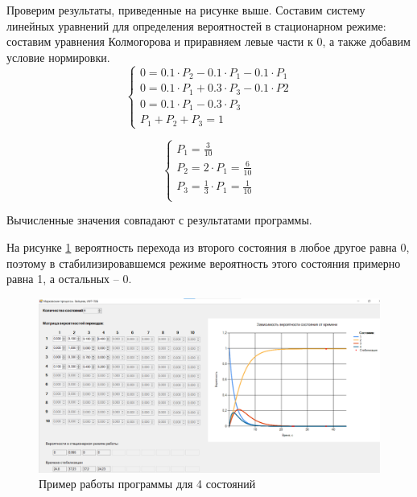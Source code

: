 \documentclass[14pt, a4paper]{extarticle}
\begin{document}
Проверим результаты, приведенные на рисунке выше. Составим систему линейных уравнений для определения вероятностей в стационарном режиме: составим уравнения Колмогорова и приравняем левые части к 0, а также добавим условие нормировки.
\begin{equation}
	\left\{\begin{array}{l}
		0 = 0.1 \cdot P_2 - 0.1 \cdot P_1 - 0.1 \cdot P_1 \\
		0 = 0.1 \cdot P_1 + 0.3 \cdot P_3 - 0.1 \cdot P2 \\
		0 = 0.1 \cdot P_1 - 0.3 \cdot P_3 \\
		P_1 + P_2 + P_3 = 1
	\end{array}\right.
\end{equation}

\begin{equation}
	\left\{\begin{array}{l}
		P_1 = \frac{3}{10} \\
		P_2 = 2 \cdot P_1 = \frac{6}{10} \\
		P_3 = \frac{1}{3} \cdot P_1 = \frac{1}{10} \\
	\end{array}\right.
\end{equation}

Вычисленные значения совпадают с результатами программы.



\newpage
На рисунке \ref{pic:2} вероятность перехода из второго состояния в любое другое равна 0, поэтому в стабилизировавшемся режиме вероятность этого состояния примерно равна 1, а остальных -- 0.
\begin{figure}[h]
	\begin{center}
		{\includegraphics[scale=0.45]{pictures/2.png}
			\caption{Пример работы программы для 4 состояний}
			\label{pic:2}}
	\end{center}
\end{figure}
\end{document}
